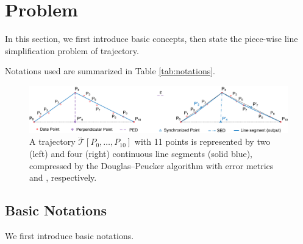 \section{Problem}
In this section, we first introduce basic concepts, then state the piece-wise line simplification problem of trajectory.

Notations used are summarized in Table \ref{tab:notations}.

\begin{figure}[tb!]
\centering
\vspace{-1ex}
\includegraphics[scale=0.66]{figures/Fig-DP.png}
\vspace{-1ex}
\caption{\small A trajectory $\dddot{\mathcal{T}}[P_0, \ldots, P_{10}]$  with 11 points is represented by two (left) and four (right) continuous line segments (solid blue), compressed by the Douglas--Peucker algorithm \cite{Douglas:Peucker} with error metrics \ped and \sed, respectively.}
\vspace{-2ex}
\label{fig:notations}
\end{figure}


\subsection{Basic Notations}
\label{subsec-notation}

We first introduce basic notations.

